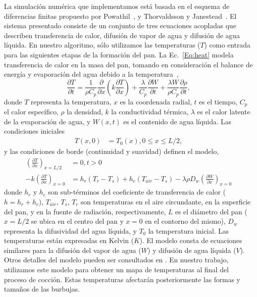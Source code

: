 La simulación numérica que implementamos está basada en el esquema de diferencias finitas propuesto por Powathil~\cite{Powathil2004}, y Thorvaldsson y Janestead~\cite{Thorvaldsson1999}. 
El sistema presentado consiste de un conjunto de tres ecuaciones acopladas que describen transferencia de calor, difusión de vapor de agua y difusión de agua líquida.
En nuestro algoritmo, sólo utilizamos las temperaturas ($T$) como entrada para las siguientes etapas de la formación del pan.
La Ec.~\ref{Eq:heat} modela transferencia de calor en la masa del pan, tomando en consideración el balance de energía y evaporación del agua debido a la temperatura~\cite{Thorvaldsson1999},
%
\begin{equation}
\label{Eq:heat}
\frac{\partial T}{\partial t} = \frac{1}{\rho C_{p}} \frac{\partial}{\partial x} \left ( k \frac{\partial T}{\partial x} \right ) + \frac{\lambda}{C_{p}} \frac{\partial W}{\partial t}+\frac{\lambda W}{ \rho C_{p} }\frac{\partial \rho}{\partial t},
\end{equation}
%
\noindent donde $T$ representa la temperatura, $x$ es la coordenada radial, $t$ es el tiempo, $C_{p}$ el calor específico, $\rho$ la densidad, $k$ la conductividad térmica, $\lambda$ es el calor latente de la evaporación de agua, y $W(x,t)$ es el contenido de agua líquida. 
Las condiciones iniciales
%
\begin{align*}
T(x,0) &= T_{0}(x), 0\le x \le L/2,
\end{align*}
y las condiciones de borde (continuidad y suavidad) definen el modelo,
\begin{align*}
\left ( \frac{\partial T}{\partial x} \right )_{x=L/2} &= 0 , t > 0 \\
-k \left ( \frac{\partial T}{\partial x} \right )_{x=0} &= h_{r}(T_{r}-T_{s}) + h_{c}(T_{air}-T_{s}) - \lambda \rho D_{w} \left (\frac{\partial W}{\partial x} \right )_{x=0}
\end{align*}
%
\noindent donde $h_{r}$ y $h_{c}$ son sub-términos del coeficiente de transferencia de calor ($h = h_{r}+h_{c}$), $T_{air}$, $T_{s}$, $T_{r}$ son temperaturas en el aire circundante, en la superficie del pan, y en la fuente de radiación, respectivamente, $L$ es el diámetro del pan ($x = L/2$ se ubica en el centro del pan y $x = 0$ en el contorno del mismo), $D_{w}$ representa la difusividad del agua líquida, y $T_{0}$ la temperatura inicial. 
Las temperaturas están expresadas en Kelvin ($K$). 
El modelo consta de ecuaciones similares para la difusión del vapor de agua ($W$) y difusión de agua líquida ($V$).
Otros detalles del modelo pueden ser consultados en \cite{Thorvaldsson1999}.
En nuestro trabajo, utilizamos este modelo para obtener un mapa de temperaturas al final del proceso de cocción.
Estas temperaturas afectarán posteriormente las formas y tamaños de las burbujas.

